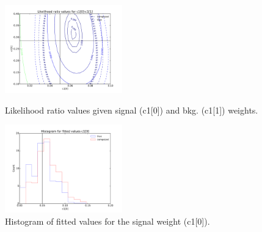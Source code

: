 \documentclass[a4paper]{jpconf}
\begin{document}
\begin{figure}[h]
\begin{minipage}{11pc}
\includegraphics[width=12pc]{comp_train_mlp_multilikelihood.pdf}
\caption{\label{fig:2dfit} Likelihood ratio values given signal (c1[0]) and bkg. (c1[1]) weights.} %
\end{minipage}\hspace{2pc}%
\begin{minipage}{11pc}
\includegraphics[width=12pc]{c1c2_train_mlp_c1_hist.pdf}
\caption{\label{fig:hist1} Histogram of fitted values for the signal weight (c1[0]).}
\end{minipage}\hspace{2pc}

\end{figure}
\end{document}

